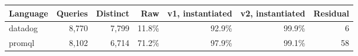 \begin{tabular}{@{}lrrrrrr@{}}
\toprule
Language & Queries & Distinct & Raw & v1, instantiated & v2, instantiated & Residual \\
\midrule
datadog & 8,770 & 7,799 & 11.8\% & 92.9\% & 99.9\% & 6 \\
promql & 8,102 & 6,714 & 71.2\% & 97.9\% & 99.1\% & 58 \\
\bottomrule
\end{tabular}
